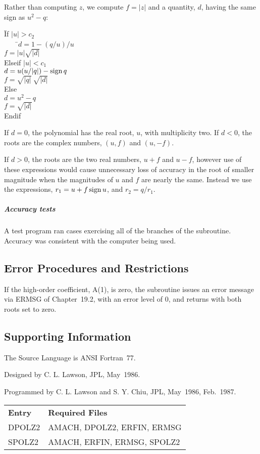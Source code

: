 \documentclass[twoside]{MATH77}
\begin{document}
Rather than computing $z$, we compute $f=|z|$ and a quantity, $d$, having
the same sign as $u^2-q:$
\begin{tabbing}
\hspace{.2in}\=If $|u| > c_2$\\
\>\ \ \ \ \=$d=1-(q/u)/u$\\
\>\>$f = |u| \sqrt{|d|}$\\
\>Elseif $|u| < c_1$\\
\>\>$d=u(u/|q|)- \sign q$\\
\>\>$f = \sqrt{|q|} \ \sqrt{|d|}$\\
\>Else\\
\>\>$d=u^2-q$\\
\>\>$f = \sqrt{|d|}$\\
\>Endif
\end{tabbing}
If $d=0$, the polynomial has the real root, $u$, with multiplicity two. If $%
d<0$, the roots are the complex numbers, $(u,f)$ and $(u,-f).$

If $d>0$, the roots are the two real numbers, $u+f$ and $u-f$, however use
of these expressions would cause unnecessary loss of accuracy in the root of
smaller magnitude when the magnitudes of $u$ and $f$ are nearly the same.
Instead we use the expressions, $r_1=u+f \sign u$, and $r_2=q/r_1.$

\subparagraph{Accuracy tests}

A test program ran cases exercising all of the branches of the subroutine.
Accuracy was consistent with the computer being used.

\subsection{Error Procedures and Restrictions}

If the high-order coefficient, A(1), is zero, the subroutine issues an error
message via ERMSG of Chapter~19.2, with an error level of 0,
and returns with both roots set to zero.

\subsection{Supporting Information}

The Source Language is ANSI Fortran~77.

Designed by C. L. Lawson, JPL, May~1986.

Programmed by C. L. Lawson and S. Y. Chiu, JPL, May~1986, Feb.~1987.


\begin{tabular}{@{\bf}l@{\hspace{5pt}}l}
\bf Entry & \hspace{.35in} {\bf Required Files}\vspace{2pt}\\
DPOLZ2 & \parbox[t]{2.7in}{ \raggedright
 AMACH, DPOLZ2, ERFIN, ERMSG\rule[-5pt]{0pt}{8pt}}\\
SPOLZ2 & \parbox[t]{2.7in}{ \raggedright
 AMACH, ERFIN, ERMSG, SPOLZ2}\\
\end{tabular}
\end{document}
